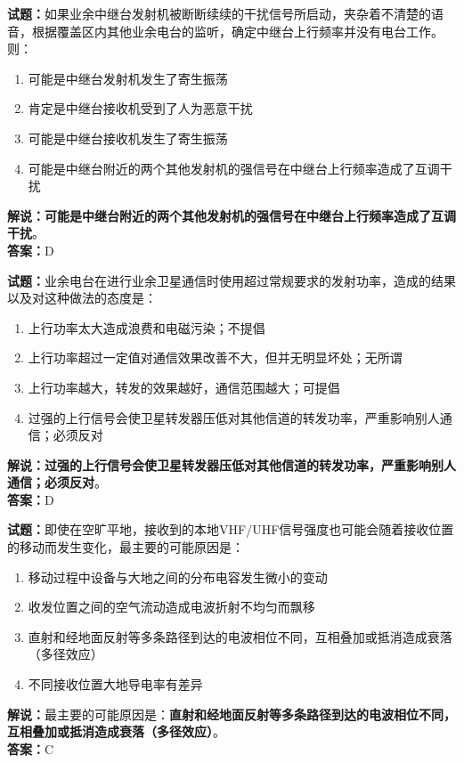 \documentclass{ctexbook}
\begin{document}
\bigskip


\noindent\textbf{试题：}如果业余中继台发射机被断断续续的干扰信号所启动，夹杂着不清楚的语音，根据覆盖区内其他业余电台的监听，确定中继台上行频率并没有电台工作。则：
\begin{enumerate}[leftmargin=3em]
\item 可能是中继台发射机发生了寄生振荡
\item 肯定是中继台接收机受到了人为恶意干扰
\item 可能是中继台接收机发生了寄生振荡
\item 可能是中继台附近的两个其他发射机的强信号在中继台上行频率造成了互调干扰
\end{enumerate}
\noindent\textbf{解说：可能是中继台附近的两个其他发射机的强信号在中继台上行频率造成了互调干扰}。\\\noindent\textbf{答案：}D



\bigskip


\noindent\textbf{试题：}业余电台在进行业余卫星通信时使用超过常规要求的发射功率，造成的结果以及对这种做法的态度是：
\begin{enumerate}[leftmargin=3em]
\item 上行功率太大造成浪费和电磁污染；不提倡
\item 上行功率超过一定值对通信效果改善不大，但并无明显坏处；无所谓
\item 上行功率越大，转发的效果越好，通信范围越大；可提倡
\item 过强的上行信号会使卫星转发器压低对其他信道的转发功率，严重影响别人通信；必须反对
\end{enumerate}
\noindent\textbf{解说：}\textbf{过强的上行信号会使卫星转发器压低对其他信道的转发功率，严重影响别人通信；必须反对}。\\\noindent\textbf{答案：}D



\bigskip


\noindent\textbf{试题：}即使在空旷平地，接收到的本地VHF/UHF信号强度也可能会随着接收位置的移动而发生变化，最主要的可能原因是：
\begin{enumerate}[leftmargin=3em]
\item 移动过程中设备与大地之间的分布电容发生微小的变动
\item 收发位置之间的空气流动造成电波折射不均匀而飘移
\item 直射和经地面反射等多条路径到达的电波相位不同，互相叠加或抵消造成衰落（多径效应）
\item 不同接收位置大地导电率有差异
\end{enumerate}
\noindent\textbf{解说：}最主要的可能原因是：\textbf{直射和经地面反射等多条路径到达的电波相位不同，互相叠加或抵消造成衰落（多径效应）}。\\\noindent\textbf{答案：}C
\end{document}
